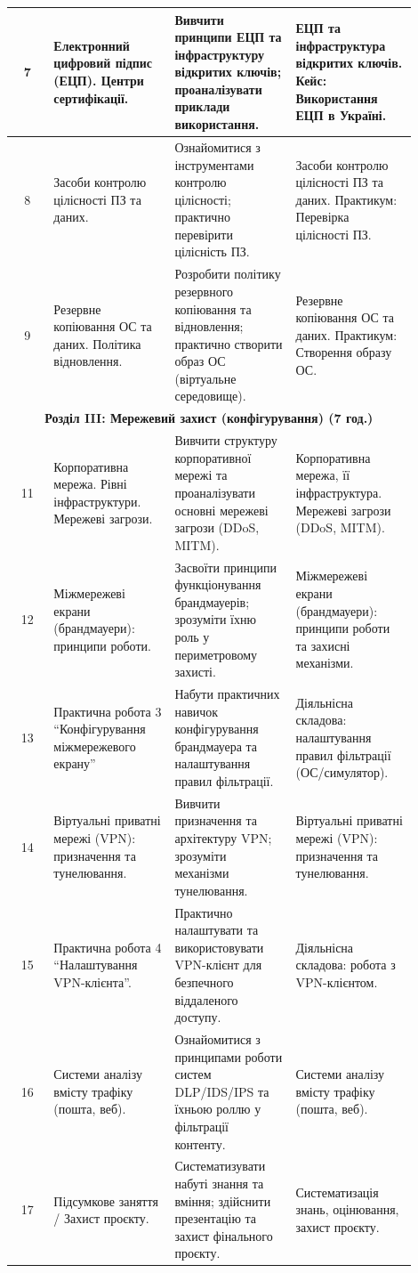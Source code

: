 {\begin{longtable} {|c|p{0.3\linewidth}|p{0.3\linewidth}|p{0.3\linewidth}|}
\hline
7 & Електронний цифровий підпис (ЕЦП). Центри сертифікації. & Вивчити принципи ЕЦП та інфраструктуру відкритих ключів; проаналізувати приклади використання. & ЕЦП та інфраструктура відкритих ключів. Кейс: Використання ЕЦП в Україні. \\
\hline
8 & Засоби контролю цілісності ПЗ та даних. & Ознайомитися з інструментами контролю цілісності; практично перевірити цілісність ПЗ. & Засоби контролю цілісності ПЗ та даних. Практикум: Перевірка цілісності ПЗ. \\
\hline
9 & Резервне копіювання ОС та даних. Політика відновлення. & Розробити політику резервного копіювання та відновлення; практично створити образ ОС (віртуальне середовище). & Резервне копіювання ОС та даних. Практикум: Створення образу ОС. \\
\hline
\multicolumn{4}{|c|}{\textbf{Розділ III: Мережевий захист (конфігурування) (7 год.)}} \\
\hline
11 & Корпоративна мережа. Рівні інфраструктури. Мережеві загрози. & Вивчити структуру корпоративної мережі та проаналізувати основні мережеві загрози (DDoS, MITM). & Корпоративна мережа, її інфраструктура. Мережеві загрози (DDoS, MITM). \\
\hline
12 & Міжмережеві екрани (брандмауери): принципи роботи. & Засвоїти принципи функціонування брандмауерів; зрозуміти їхню роль у периметровому захисті. & Міжмережеві екрани (брандмауери): принципи роботи та захисні механізми. \\
\hline
13 & Практична робота 3 ``Конфігурування міжмережевого екрану''  & Набути практичних навичок конфігурування брандмауера та налаштування правил фільтрації. & Діяльнісна складова: налаштування правил фільтрації (ОС/симулятор). \\
\hline
14 & Віртуальні приватні мережі (VPN): призначення та тунелювання. & Вивчити призначення та архітектуру VPN; зрозуміти механізми тунелювання. & Віртуальні приватні мережі (VPN): призначення та тунелювання. \\
\hline
15 & Практична робота 4 ``Налаштування VPN-клієнта''. & Практично налаштувати та використовувати VPN-клієнт для безпечного віддаленого доступу. & Діяльнісна складова: робота з VPN-клієнтом. \\
\hline
16 & Системи аналізу вмісту трафіку (пошта, веб). & Ознайомитися з принципами роботи систем DLP/IDS/IPS та їхньою роллю у фільтрації контенту. & Системи аналізу вмісту трафіку (пошта, веб). \\
\hline
17 & Підсумкове заняття / Захист проєкту. & Систематизувати набуті знання та вміння; здійснити презентацію та захист фінального проєкту. & Систематизація знань, оцінювання, захист проєкту. \\
\hline
\end{longtable}
}


